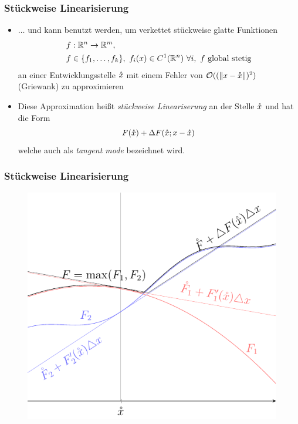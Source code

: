 \begin{frame}[<+->]
\frametitle{Stückweise Linearisierung}
\begin{itemize}
 \item $\ldots$ und kann benutzt werden, um verkettet stückweise glatte Funktionen 
 \[
 \begin{aligned}
   f&:\mathbb R^n \to \mathbb R^m, \\
 f&\in \lbrace f_1,\ldots,f_k\rbrace,~f_i(x) \in C^1(\mathbb R^n)~\forall i,~f \text{ global stetig}
 \end{aligned}
 \]
an einer Entwicklungsstelle $\mathring{x}$ mit einem Fehler von $\mathcal O((\|x-\mathring{x}\|)^2)$ (Griewank) zu approximieren
\item Diese Approximation heißt \textit{stückweise Lineariserung} an der Stelle $\mathring{x}$ und hat die Form 
\[
 F(\mathring{x}) + \Delta F(\mathring{x}; x-\mathring{x})
\]
welche auch als \textit{tangent mode} bezeichnet wird.
\end{itemize}

\end{frame}

\begin{frame}[<+->]
\frametitle{Stückweise Linearisierung}
\begin{figure}
\centering
\includegraphics[width=0.65\linewidth]{../dipl_tex/img/tikz/piecewise_linearization.pdf}
\end{figure}
\end{frame}